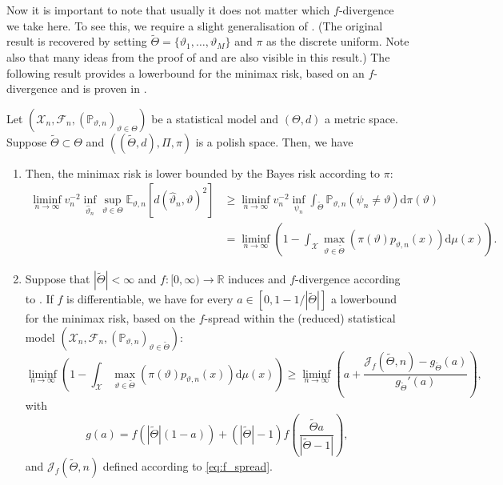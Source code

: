 \documentclass[a4paper]{article}
\begin{document}
Now it is important to note that usually it does not matter which $f$-divergence we take here. To see this, we require a slight generalisation of . (The original result is recovered by setting $\tilde{\Theta}=\{\vartheta_1, \dots, \vartheta_M\}$ and $\pi$ as the discrete uniform. Note also that many ideas from the proof of  and  are also visible in this result.) The following result provides a lowerbound for the minimax risk, based on an $f$-divergence and is proven in \cite[II.2]{guntuboyinaLowerBoundsMinimax2011}.
\begin{proposition}
Let $(\mathcal{X}_n, \mathcal{F}_n, (\mathbb{P}_{\vartheta,n})_{\vartheta \in \Theta})$ be a statistical model and $(\Theta,d)$ a metric space. Suppose $\tilde{\Theta}\subset \Theta$ and $((\tilde{\Theta},d), \Pi, \pi)$ is a polish space. Then, we have
\begin{enumerate}
\item Then, the minimax risk is lower bounded by the Bayes risk according to $\pi$:
\begin{equation*}
\begin{aligned}
\liminf_{n \rightarrow \infty} v_n^{-2} \inf_{\hat{\vartheta}_n} \sup_{\vartheta \in \Theta} \mathbb{E}_{\vartheta,n}[d(\hat{\vartheta}_{n}, \vartheta)^{2}] &\geq \liminf_{n \rightarrow \infty} v_n^{-2} \inf_{\psi_n} \int_{\tilde{\Theta}} \mathbb{P}_{\vartheta, n}(\psi_n \neq \vartheta) \mathrm{d}\pi(\vartheta)\\
&=\liminf_{n \rightarrow \infty} \left(1-\int_{\mathcal{X}}\max_{\vartheta \in \tilde{\Theta}} (\pi(\vartheta)p_{\vartheta, n}(x))\mathrm{d}\mu(x) \right). 
\end{aligned}
\end{equation*}
\item Suppose that $|\tilde{\Theta}|< \infty$  and $f:[0,\infty) \rightarrow \mathbb{R}$ induces and $f$-divergence according to . If $f$ is differentiable, we have for every $a \in [0, 1- 1/|\tilde{\Theta}|]$ a lowerbound for the minimax risk, based on the $f$-spread within the (reduced) statistical model $(\mathcal{X}_n, \mathcal{F}_n, (\mathbb{P}_{\vartheta,n})_{\vartheta \in \tilde{\Theta}})$:
\begin{equation*}
\liminf_{n \rightarrow \infty} \left(1-\int_{\mathcal{X}}\max_{\vartheta \in \tilde{\Theta}} (\pi(\vartheta)p_{\vartheta, n}(x))\mathrm{d}\mu(x) \right) \geq \liminf_{n \rightarrow \infty} \left(a + \frac{\mathcal{J}_f(\tilde{\Theta},n)-g_{\tilde{\Theta}}(a)}{g_{\tilde{\Theta}}'(a)}\right),
\end{equation*}
with 
\begin{equation*}
g(a)=f(|\tilde{\Theta}|(1-a))+ (|\tilde{\Theta}|-1)f\left(\frac{\tilde{\Theta}a}{|\tilde{\Theta}-1|}\right),
\end{equation*}
and $\mathcal{J}_f(\tilde{\Theta},n)$ defined according to \eqref{eq:f_spread}. 
\end{enumerate}
\end{proposition}
\end{document}
